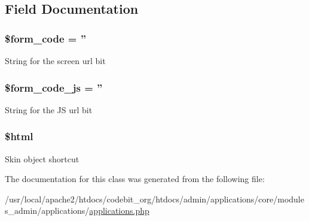\subsection{Field Documentation}
\hypertarget{classadmin__core__applications__applications_af28aee726fa3eb6c355d08a2ab655e03}{
\subsubsection[{\$form\-\_\-code}]{\setlength{\rightskip}{0pt plus 5cm}\$form\-\_\-code = ''}}\label{classadmin__core__applications__applications_af28aee726fa3eb6c355d08a2ab655e03}
String for the screen url bit \hypertarget{classadmin__core__applications__applications_ac68fe8a02a2efd63c3271179f4b4fbb7}{
\subsubsection[{\$form\-\_\-code\-\_\-js}]{\setlength{\rightskip}{0pt plus 5cm}\$form\-\_\-code\-\_\-js = ''}}\label{classadmin__core__applications__applications_ac68fe8a02a2efd63c3271179f4b4fbb7}
String for the J\-S url bit \hypertarget{classadmin__core__applications__applications_a6f96e7fc92441776c9d1cd3386663b40}{
\subsubsection[{\$html}]{\setlength{\rightskip}{0pt plus 5cm}\$html}}\label{classadmin__core__applications__applications_a6f96e7fc92441776c9d1cd3386663b40}
Skin object shortcut 

The documentation for this class was generated from the following file\-:\begin{DoxyCompactItemize}
\item 
/usr/local/apache2/htdocs/codebit\-\_\-org/htdocs/admin/applications/core/modules\-\_\-admin/applications/\hyperlink{applications_8php}{applications.\-php}\end{DoxyCompactItemize}
